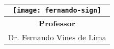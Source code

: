 \documentclass[pretext-section.tex]{subfiles}
\begin{document}
\begin{folhadeaprovacao}
    \begin{center}
      \begin{tabular}[b]{@{} c @{}}
        \texttt{[image: fernando-sign]} \\
        \hline
        \textbf{Professor} \\ Dr. Fernando Vines de Lima
      \end{tabular}
    \end{center}


        
     \begin{center}
      \vspace*{0.5cm}
      {\large\imprimirlocal}
      \par
      {\large\imprimirdata}
      \vspace*{1cm}
    \end{center}
    
  \end{folhadeaprovacao}
\end{document}
